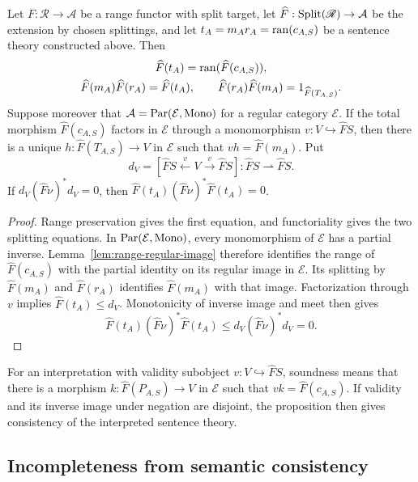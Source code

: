 \begin{proposition}\label{prop:interpreted-theory}
Let $F:\mathscr R\to\mathcal A$ be a range functor with split
target, let $\widehat F:\operatorname{Split}(\mathscr R)\to\mathcal A$ be the
extension by chosen splittings, and let $t_A=m_A r_A=\operatorname{ran}(c_{A,S})$
be a sentence theory constructed above. Then
\begin{gather*}
 \widehat F(t_A)=\operatorname{ran}(\widehat F(c_{A,S})),\\
 \widehat F(m_A)\widehat F(r_A)=\widehat F(t_A),\qquad
 \widehat F(r_A)\widehat F(m_A)=1_{\widehat F(T_{A,S})}.
\end{gather*}
Suppose moreover that $\mathcal A=\operatorname{Par}(\mathcal E,\operatorname{Mono})$ for a
regular category $\mathcal E$. If the total morphism
$\widehat F(c_{A,S})$ factors in $\mathcal E$ through a
monomorphism $v:V\hookrightarrow\widehat F S$, then
there is a unique $h:\widehat F(T_{A,S})\to V$ in $\mathcal E$
such that $v h=\widehat F(m_A)$. Put
\[
 d_V=[\widehat F S\xleftarrow{v}V\xrightarrow{v}\widehat F S]:
 \widehat F S\rightharpoonup\widehat F S.
\]
If $d_V(\widehat F\nu)^*d_V=0$, then
$\widehat F(t_A)(\widehat F\nu)^*\widehat F(t_A)=0$.
\end{proposition}
\begin{proof}
Range preservation gives the first equation, and functoriality
gives the two splitting equations. In $\operatorname{Par}(\mathcal E,\operatorname{Mono})$,
every monomorphism of $\mathcal E$ has a partial inverse.
Lemma~\ref{lem:range-regular-image} therefore identifies the range
of $\widehat F(c_{A,S})$ with the partial identity on its regular
image in $\mathcal E$. Its splitting by $\widehat F(m_A)$ and
$\widehat F(r_A)$ identifies $\widehat F(m_A)$ with that image.
Factorization through $v$ implies
$\widehat F(t_A)\le d_V$. Monotonicity of inverse image and meet
then gives
\[
 \widehat F(t_A)(\widehat F\nu)^*\widehat F(t_A)
 \le d_V(\widehat F\nu)^*d_V=0.
\]
\end{proof}

For an interpretation with validity subobject
$v:V\hookrightarrow\widehat F S$, soundness means that there is a morphism
$k:\widehat F(P_{A,S})\to V$ in $\mathcal E$ such that
$v k=\widehat F(c_{A,S})$. If validity and its inverse image under
negation are disjoint, the proposition then gives consistency of the
interpreted sentence theory.

\subsection{Incompleteness from semantic consistency}

